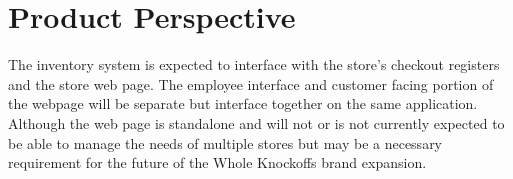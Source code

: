 \documentclass{scrreprt}
\theoremstyle{funreq}
\begin{document}
\section{Product Perspective}
The inventory system is expected to interface with the store's checkout registers and the store web page. The employee interface and customer facing portion of the webpage will be separate but interface together on the same application. Although the web page is standalone and will not or is not currently expected to be able to manage the needs of multiple stores but may be a necessary requirement for the future of the Whole Knockoffs brand expansion. %
\end{document}
